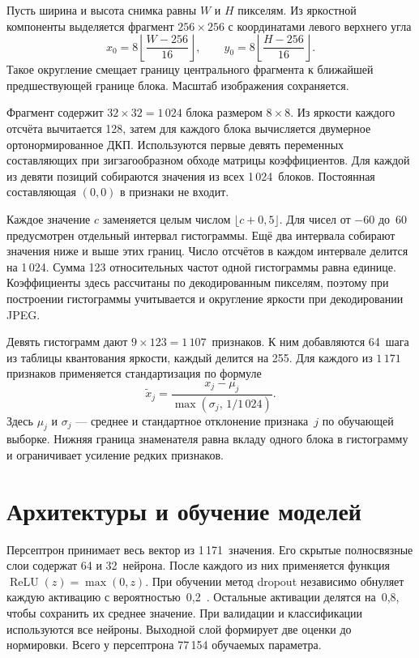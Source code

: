 Пусть ширина и высота снимка равны $W$ и $H$ пикселям. Из яркостной компоненты выделяется фрагмент $256\times256$ с координатами левого верхнего угла
\begin{equation}
  x_0=8\left\lfloor\frac{W-256}{16}\right\rfloor,\qquad
  y_0=8\left\lfloor\frac{H-256}{16}\right\rfloor.
  \label{eq:crop}
\end{equation}
Такое округление смещает границу центрального фрагмента к ближайшей предшествующей границе блока. Масштаб изображения сохраняется.

Фрагмент содержит $32\times32=1\,024$ блока размером $8\times8$. Из яркости каждого отсчёта вычитается 128, затем для каждого блока вычисляется двумерное ортонормированное ДКП. Используются первые девять переменных составляющих при зигзагообразном обходе матрицы коэффициентов. Для каждой из девяти позиций собираются значения из всех 1\,024~блоков. Постоянная составляющая $(0,0)$ в признаки не входит.

Каждое значение $c$ заменяется целым числом $\lfloor c+0{,}5\rfloor$. Для чисел от $-60$ до~60 предусмотрен отдельный интервал гистограммы. Ещё два интервала собирают значения ниже и выше этих границ. Число отсчётов в каждом интервале делится на 1\,024. Сумма 123 относительных частот одной гистограммы равна единице. Коэффициенты здесь рассчитаны по декодированным пикселям, поэтому при построении гистограммы учитывается и округление яркости при декодировании JPEG.

Девять гистограмм дают $9\times123=1\,107$~признаков. К ним добавляются 64~шага из таблицы квантования яркости, каждый делится на 255. Для каждого из $1\,171$ признаков применяется стандартизация по формуле
\begin{equation}
 \widetilde{x}_j =
 \frac{x_j-\mu_j}{\max(\sigma_j,\,1/1\,024)}.
 \label{eq:scale}
\end{equation}
Здесь $\mu_j$ и $\sigma_j$ --- среднее и стандартное отклонение признака~$j$ по обучающей выборке. Нижняя граница знаменателя равна вкладу одного блока в гистограмму и ограничивает усиление редких признаков.

\section{Архитектуры и обучение моделей}

Персептрон принимает весь вектор из 1\,171~значения. Его скрытые полносвязные слои содержат 64 и 32~нейрона. После каждого из них применяется функция $\operatorname{ReLU}(z)=\max(0,z)$. При обучении метод dropout независимо обнуляет каждую активацию с вероятностью~0,2~\cite{dropout}. Остальные активации делятся на~0,8, чтобы сохранить их среднее значение. При валидации и классификации используются все нейроны. Выходной слой формирует две оценки до нормировки. Всего у персептрона 77\,154 обучаемых параметра.


